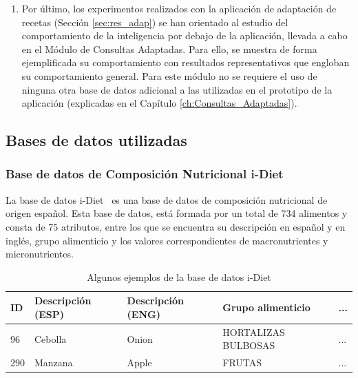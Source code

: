 \begin{enumerate}
    \item Por último, los experimentos realizados con la aplicación de adaptación de recetas (Sección \ref{sec:res_adap}) se han orientado al estudio del comportamiento de la inteligencia por debajo de la aplicación, llevada a cabo en el Módulo de Consultas Adaptadas. Para ello, se muestra de forma ejemplificada su comportamiento con resultados representativos que engloban su comportamiento general. Para este módulo no se requiere el uso de ninguna otra base de datos adicional a las utilizadas en el prototipo de la aplicación (explicadas en el Capítulo \ref{ch:Consultas_Adaptadas}).
    
\end{enumerate}


\subsection{Bases de datos utilizadas}\label{sec:bds}

\subsubsection{Base de datos de Composición Nutricional i-Diet}\label{subsec:idiet}
La base de datos i-Diet~\cite{iDietrf} es una base de datos de composición nutricional de origen español. Esta base de datos, está formada por un total de 734 alimentos y consta de 75 atributos, entre los que se encuentra su descripción en español y en inglés, grupo alimenticio y los valores correspondientes de macronutrientes y micronutrientes.

\setlength{\tabcolsep}{3pt} 
\begin{table}[H]
	\begin{center}
		\begin{tabular}{p{}|p{}|p{}|p{}|p{}}
			\rule{0pt}{12pt}
			\textbf{ID}  & \textbf{Descripción (ESP)} & \textbf{Descripción (ENG)} & \textbf{Grupo alimenticio} & ... \tabularnewline
			\hline
			
			96 & Cebolla & Onion &  HORTALIZAS BULBOSAS & ... \\
			290 & Manzana & Apple & FRUTAS  & ... \\			
		
		\end{tabular}
		{\caption{Algunos ejemplos de la base de datos i-Diet} \label{table5}}
	\end{center}
\end{table}

